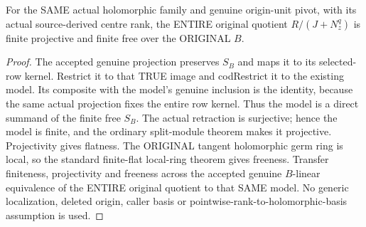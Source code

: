 \begin{theorem}
\label{hir:actual-centre-whole-principal-parts-finite-free}
For the SAME actual holomorphic family and genuine origin-unit pivot,
with its actual source-derived centre rank, the ENTIRE original quotient
$R/(J+N_z^q)$ is finite projective and finite free over the ORIGINAL $B$.
\leanok
\end{theorem}
\begin{proof}
The accepted genuine projection preserves $S_B$ and maps it to its
selected-row kernel. Restrict it to that TRUE image and codRestrict it
to the existing model. Its composite with the model's genuine inclusion
is the identity, because the same actual projection fixes the entire
row kernel. Thus the model is a direct summand of the finite free $S_B$.
The actual retraction is surjective; hence the model is finite, and the
ordinary split-module theorem makes it projective. Projectivity gives
flatness. The ORIGINAL tangent holomorphic germ ring is local, so the
standard finite-flat local-ring theorem gives freeness. Transfer
finiteness, projectivity and freeness across the accepted genuine
$B$-linear equivalence of the ENTIRE original quotient to that SAME
model. No generic localization, deleted origin, caller basis or
pointwise-rank-to-holomorphic-basis assumption is used.
\end{proof}

